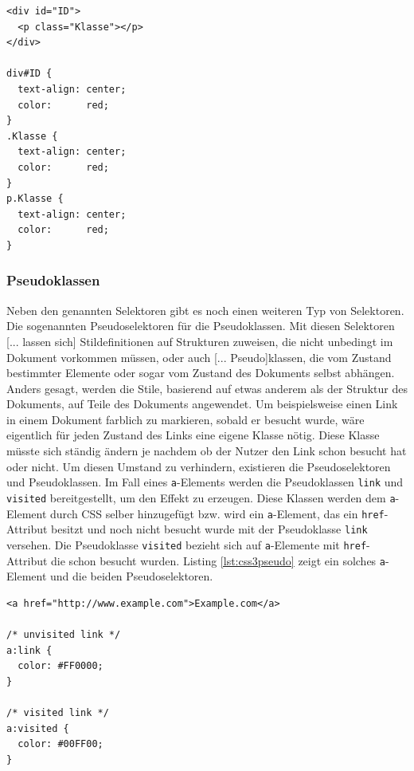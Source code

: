 \vspace{1em}
\begin{lstlisting}[language=HTML5, caption=CSS3 Klassen- und ID-Selektoren, label=lst:css3idclass]
<div id="ID">
  <p class="Klasse"></p>
</div>

div#ID {
  text-align: center;
  color:      red;
}
.Klasse {
  text-align: center;
  color:      red;
}
p.Klasse {
  text-align: center;
  color:      red;
}
\end{lstlisting}
	
\subsubsection{Pseudoklassen} Neben den genannten Selektoren gibt es noch einen weiteren Typ von Selektoren. Die sogenannten Pseudoselektoren für die Pseudoklassen. \glqq Mit diesen Selektoren [... lassen sich] Stildefinitionen auf Strukturen zuweisen, die nicht unbedingt im Dokument vorkommen müssen, oder auch [... Pseudo]klassen, die vom Zustand bestimmter Elemente oder sogar vom Zustand des Dokuments selbst abhängen. Anders gesagt, werden die Stile, basierend auf etwas anderem als der Struktur des Dokuments, auf Teile des Dokuments angewendet.\grqq{}\cite[S.53ff]{MeyeCasc2005} Um beispielsweise einen Link in einem Dokument farblich zu markieren, sobald er besucht wurde, wäre eigentlich für jeden Zustand des Links eine eigene Klasse nötig. Diese Klasse müsste sich ständig ändern je nachdem ob der Nutzer den Link schon besucht hat oder nicht. Um diesen Umstand zu verhindern, existieren die Pseudoselektoren und Pseudoklassen. Im Fall eines \texttt{a}-Elements werden die Pseudoklassen \texttt{link} und \texttt{visited} bereitgestellt, um den Effekt zu erzeugen. Diese Klassen werden dem \texttt{a}-Element durch CSS selber hinzugefügt bzw. wird ein \texttt{a}-Element, das ein \texttt{href}-Attribut besitzt und noch nicht besucht wurde mit der Pseudoklasse \texttt{link} versehen. Die Pseudoklasse \texttt{visited} bezieht sich auf \texttt{a}-Elemente mit \texttt{href}-Attribut die schon besucht wurden. Listing \ref{lst:css3pseudo} zeigt ein solches \texttt{a}-Element und die beiden Pseudoselektoren.

\vspace{1em}
\begin{lstlisting}[language=HTML5, caption=CSS3 Pseudoklassen und -selektoren, label=lst:css3pseudo]
<a href="http://www.example.com">Example.com</a>

/* unvisited link */
a:link {
  color: #FF0000;
}

/* visited link */
a:visited {
  color: #00FF00;
}
\end{lstlisting}

